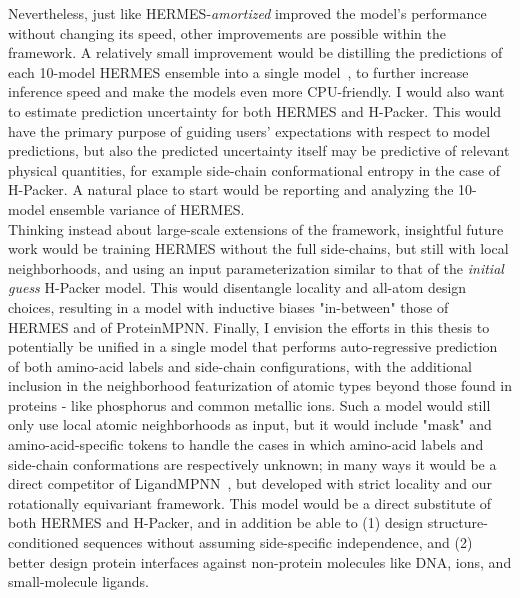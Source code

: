Nevertheless, just like HERMES-\textit{amortized} improved the model's performance without changing its speed,
other improvements are possible within the framework.
A relatively small improvement would be distilling the predictions of each 10-model HERMES ensemble into a single model~\citep{hinton_distilling_2015},
to further increase inference speed and make the models even more CPU-friendly.
I would also want to estimate prediction uncertainty for both HERMES and H-Packer. This would have the primary purpose of guiding users'
expectations with respect to model predictions, but also the predicted uncertainty itself may be predictive of relevant physical quantities,
for example side-chain conformational entropy in the case of H-Packer.
A natural place to start would be reporting and analyzing the 10-model ensemble variance of HERMES.\\
Thinking instead about large-scale extensions of the framework, insightful future work would be training HERMES without the full side-chains,
but still with local neighborhoods, and using an input parameterization similar to that of the \textit{initial guess} H-Packer model.
This would disentangle locality and all-atom design choices, resulting in a model with inductive biases "in-between" those of HERMES
and of ProteinMPNN.
Finally, I envision the efforts in this thesis to potentially be unified in a single model that performs auto-regressive prediction of both
amino-acid labels and side-chain configurations, with the additional inclusion in the neighborhood featurization of atomic types beyond those
found in proteins - like phosphorus and common metallic ions.
Such a model would still only use local atomic neighborhoods as input, but it would include "mask" and amino-acid-specific tokens to handle
the cases in which amino-acid labels and side-chain conformations are respectively unknown; in many ways it would be a direct competitor of
LigandMPNN~\citep{dauparas_atomic_2025}, but developed with strict locality and our rotationally equivariant framework.
This model would be a direct substitute of both HERMES and H-Packer, and in addition be able to
(1) design structure-conditioned sequences without assuming side-specific independence,
and (2) better design protein interfaces against non-protein molecules like DNA, ions, and small-molecule ligands.
